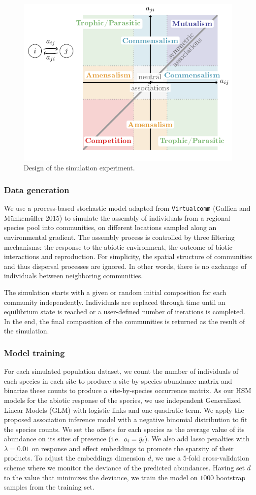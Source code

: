 \documentclass[10pt,a4paper]{article}
\newcommand{\inclPlt}[2]{\includegraphics[page=#1]{tikz_figures.pdf}}
\begin{document}
\begin{figure}[bthp]
  \centering
  \inclPlt{4}{schema_exp}
  \caption{Design of the simulation experiment.}
  \label{simexp}
\end{figure}




\subsubsection{Data generation}
We use a process-based stochastic model adapted from \texttt{Virtualcomm} (Gallien and Münkemüller 2015) to simulate the assembly of individuals from a regional species pool into communities, on different locations sampled along an environmental gradient. The assembly process is controlled by three filtering mechanisms: the response to the abiotic environment, the outcome of biotic interactions and reproduction.  For simplicity, the spatial structure of communities and thus dispersal processes are ignored. In other words, there is no exchange of individuals between neighboring communities.

The simulation starts with a given or random initial composition for each community independently. Individuals are replaced through time until an equilibrium state is reached or a user-defined number of iterations is completed. In the end, the final composition of the communities is returned as the result of the simulation.

\subsubsection{Model training}
For each simulated population dataset, we count the number of individuals of each species in each site to produce a site-by-species abundance matrix and binarize these counts to produce a site-by-species occurrence matrix. 
As our HSM models for the abiotic response of the species, we use independent Generalized Linear Models (GLM) with logistic links and one quadratic term.
We apply the proposed association inference model with a negative binomial distribution to fit the species counts. We set the offsets for each species as the average value of its abundance on its sites of presence (i.e.\ $o_i=\bar{y}_{i}$). We also add lasso penalties with $\lambda=0.01$ on response and effect embeddings to promote the sparsity of their products.
To adjust the embeddings dimension $d$, we use a $5$-fold cross-validation scheme where we monitor the deviance of the predicted abundances. Having set $d$ to the value that minimizes the deviance, we train the model on $1000$ bootstrap samples from the training set.
\end{document}
